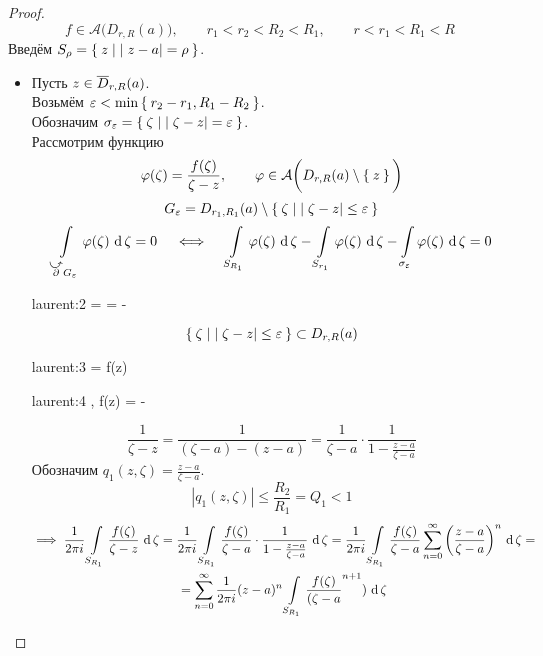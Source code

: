 \begin{proof}
	$$ f \in \mathcal A \bigg( D_{r, R}(a) \bigg), \qquad r_1 < r_2 < R_2 < R_1, \qquad r < r_1 < R_1 < R $$
	Введём $ S_\rho = \Set{ z \mid |z - a| = \rho} $.
	\begin{itemize}
		\item Пусть $ z \in \overline D_{r, R}(a) $. \\
		Возьмём $ \varepsilon < \min\Set{ r_2 - r_1, R_1 - R_2} $. \\
		Обозначим $ \sigma_\varepsilon = \Set{\zeta \mid |\zeta - z| = \varepsilon} $. \\
		Рассмотрим функцию
		$$ \varphi(\zeta) = \frac{f(\zeta)}{\zeta - z}, \qquad \varphi \in \mathcal A \bigg( D_{r, R}(a) \setminus \Set{z} \bigg) $$
		$$ G_\varepsilon = D_{r_1, R_1}(a) \setminus \Set{\zeta \mid |\zeta - z| \le \varepsilon} $$
		$$ \cint[\zeta]{\curvedir \partial G_\eps}{\vphi(\zeta)} = 0 \quad
		\iff \quad \cint[\zeta]{S_{R_1}}{\vphi(\zeta)} - \cint[\zeta]{S_{r_1}}{\vphi(\zeta)} - \cint[\zeta]{\sigma_\eps}{\vphi(\zeta)} = 0 $$
		\begin{equ}{laurent:2}
			\implies {} =  =  - 
		\end{equ}
		$$ \Set{\zeta \mid |\zeta - z| \le \varepsilon} \subset D_{r, R}(a) $$
		\begin{equ}{laurent:3}
			 = f(z)
		\end{equ}
		\begin{equ}{laurent:4}
			,  \implies f(z) =   - 
		\end{equ}
		$$ \frac1{\zeta - z} = \frac1{(\zeta - a) - (z - a)} = \frac1{\zeta - a} \cdot \frac1{1 - \frac{z - a}{\zeta - a}} $$
		Обозначим $ q_1(z, \zeta) = \frac{z - a}{\zeta - a} $.
		$$ |q_1(z, \zeta)| \le \frac{R_2}{R_1} = Q_1 < 1 $$
		\begin{multline}\lbl{laurent:6}
			\implies \frac1{2\pi i} \cint[\zeta]{S_{R_1}}{\frac{f(\zeta)}{\zeta - z}} = \frac1{2\pi i}\cint[\zeta]{S_{R_1}}{\frac{f(\zeta)}{\zeta - a} \cdot \frac1{1 - \frac{z - a}{\zeta - a}}} = \frac1{2\pi i}\cint[\zeta]{S_{R_1}}{\frac{f(\zeta)}{\zeta - a} \sum_{n = 0}^\infty \bigg( \frac{z - a}{\zeta - a} \bigg)^n} = \\
			= \sum_{n = 0}^\infty \frac1{2\pi i}(z - a)^n \cint[\zeta]{S_{R_1}}{\frac{f(\zeta)}{(\zeta - a}^{n + 1})}

\end{multline}
\end{itemize}
\end{proof}

